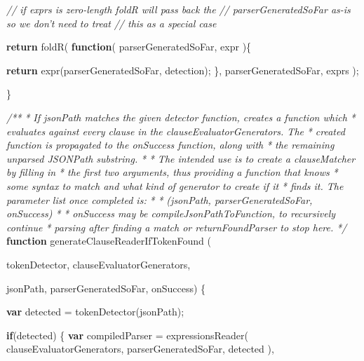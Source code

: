 \documentclass[]{article}
\newenvironment{Shaded}{}{}
\newcommand{\KeywordTok}[1]{\textcolor[rgb]{0.00,0.44,0.13}{\textbf{{#1}}}}
\newcommand{\CommentTok}[1]{\textcolor[rgb]{0.38,0.63,0.69}{\textit{{#1}}}}
\newcommand{\FunctionTok}[1]{\textcolor[rgb]{0.02,0.16,0.49}{{#1}}}
\newcommand{\NormalTok}[1]{{#1}}
\begin{document}
\begin{Shaded}
\begin{Highlighting}[]
      \CommentTok{// if exprs is zero-length foldR will pass back the }
      \CommentTok{// parserGeneratedSoFar as-is so we don't need to treat }
      \CommentTok{// this as a special case}
      
      \KeywordTok{return}   \FunctionTok{foldR}\NormalTok{( }
                  \KeywordTok{function}\NormalTok{( parserGeneratedSoFar, expr )\{}
         
                     \KeywordTok{return} \FunctionTok{expr}\NormalTok{(parserGeneratedSoFar, detection);}
                  \NormalTok{\}, }
                  \NormalTok{parserGeneratedSoFar, }
                  \NormalTok{exprs}
               \NormalTok{);                     }

   \NormalTok{\}}

   \CommentTok{/** }
\CommentTok{    *  If jsonPath matches the given detector function, creates a function which}
\CommentTok{    *  evaluates against every clause in the clauseEvaluatorGenerators. The}
\CommentTok{    *  created function is propagated to the onSuccess function, along with}
\CommentTok{    *  the remaining unparsed JSONPath substring.}
\CommentTok{    *  }
\CommentTok{    *  The intended use is to create a clauseMatcher by filling in}
\CommentTok{    *  the first two arguments, thus providing a function that knows}
\CommentTok{    *  some syntax to match and what kind of generator to create if it}
\CommentTok{    *  finds it. The parameter list once completed is:}
\CommentTok{    *  }
\CommentTok{    *    (jsonPath, parserGeneratedSoFar, onSuccess)}
\CommentTok{    *  }
\CommentTok{    *  onSuccess may be compileJsonPathToFunction, to recursively continue }
\CommentTok{    *  parsing after finding a match or returnFoundParser to stop here.}
\CommentTok{    */}
   \KeywordTok{function} \FunctionTok{generateClauseReaderIfTokenFound} \NormalTok{(}
     
                        \NormalTok{tokenDetector, clauseEvaluatorGenerators,}
                         
                        \NormalTok{jsonPath, parserGeneratedSoFar, onSuccess) \{}
                        
      \KeywordTok{var} \NormalTok{detected = }\FunctionTok{tokenDetector}\NormalTok{(jsonPath);}

      \KeywordTok{if}\NormalTok{(detected) \{}
         \KeywordTok{var} \NormalTok{compiledParser = }\FunctionTok{expressionsReader}\NormalTok{(}
                                 \NormalTok{clauseEvaluatorGenerators, }
                                 \NormalTok{parserGeneratedSoFar, }
                                 \NormalTok{detected}
                              \NormalTok{),}
         

\end{Highlighting}
\end{Shaded}
\end{document}
